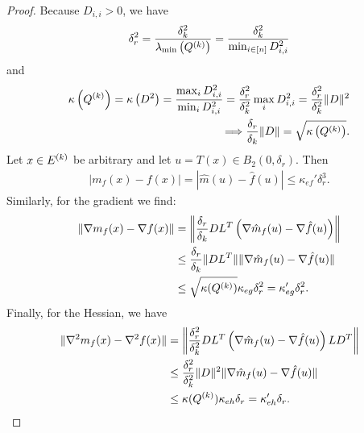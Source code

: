 \begin{proof}
Because $D_{i, i} > 0$, we have
\begin{align*}
\delta_r^2 = \frac {\delta_k^2} {\lambda_{\text{min}}\left({Q^{(k)}}\right)} = \frac {\delta_k^2} {\min_{i \in [n]} D^2_{i, i}}
\end{align*}
and
\begin{align*}
{\kappa}\left({Q^{(k)}}\right) 
= \kappa\left(D^2\right) 
= \frac{\max_{i}D_{i,i}^2}{\min_{i}D_{i,i}^2} 
= \frac{\delta_r^2}{\delta_k^2} \max_{i}D_{i,i}^2 = \frac{\delta_r^2}{\delta_k^2}\|D\|^2 \\
\Longrightarrow \frac{\delta_r} {\delta_k} \|D\| = \sqrt{{\kappa}\left({Q^{(k)}}\right)}.
\end{align*}
Let $x \in {E^{(k)}}$ be arbitrary and let $u = T(x) \in B_2(0,\delta_r)$.
Then
\begin{align*}
 | m_f(x) - f(x)| = |\hat m(u) - \hat f(u)| \le \kappa_{ef}'\delta_r^3.
\end{align*}
Similarly, for the gradient we find:
\begin{align*}
\| \nabla m_f(x) - \nabla f(x)\| &= \left\|\frac{\delta_r} {\delta_k}DL^T\left(\nabla\hat m_f(u) - \nabla \hat f(u)\right)\right\| \\
& \le \frac{\delta_r} {\delta_k} \|DL^T\|\|\nabla \hat m_f(u) - \nabla \hat f(u)\| \\
& \le \sqrt{{\kappa}({Q^{(k)}})}\kappa_{eg} \delta_r^2 = \kappa_{eg}' \delta_r^2.
\end{align*}
Finally,  for the Hessian, we have
\begin{align*}
\| \nabla^2 m_f(x) - \nabla^2 f(x)\| & = \left\|\frac{\delta_r^2} {\delta_k^2}DL^T\left(\nabla\hat m_f(u) - \nabla \hat f(u)\right)LD^T\right\| \\
& \le \frac{\delta_r^2} {\delta_k^2} \|D\|^2\|\nabla \hat m_f(u) - \nabla \hat f(u)\| \\
& \le {\kappa}({Q^{(k)}})\kappa_{eh} \delta_r = \kappa_{eh}' \delta_r.
\end{align*}

\end{proof}

